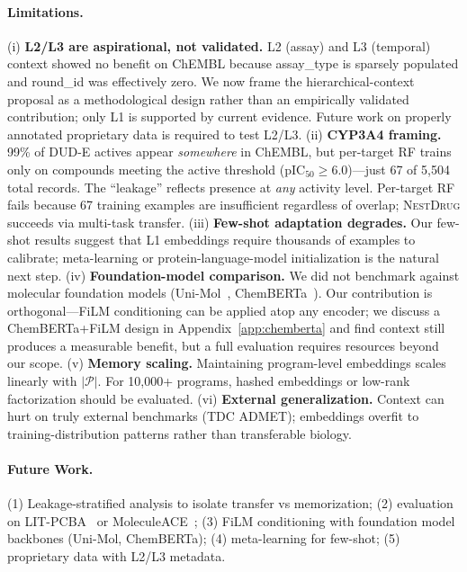 \documentclass[sigconf]{acmart}
\newcommand{\methodname}{\textsc{NestDrug}}
\begin{document}
\paragraph{Limitations.} (i) \textbf{L2/L3 are aspirational, not validated.} L2 (assay) and L3 (temporal) context showed no benefit on ChEMBL because assay\_type is sparsely populated and round\_id was effectively zero. We now frame the hierarchical-context proposal as a methodological design rather than an empirically validated contribution; only L1 is supported by current evidence. Future work on properly annotated proprietary data is required to test L2/L3. (ii) \textbf{CYP3A4 framing.} 99\% of DUD-E actives appear \textit{somewhere} in ChEMBL, but per-target RF trains only on compounds meeting the active threshold (pIC$_{50} \geq 6.0$)---just 67 of 5{,}504 total records. The ``leakage'' reflects presence at \textit{any} activity level. Per-target RF fails because 67 training examples are insufficient regardless of overlap; \methodname{} succeeds via multi-task transfer. (iii) \textbf{Few-shot adaptation degrades.} Our few-shot results suggest that L1 embeddings require thousands of examples to calibrate; meta-learning or protein-language-model initialization is the natural next step. (iv) \textbf{Foundation-model comparison.} We did not benchmark against molecular foundation models (Uni-Mol~\cite{zhou_2023_unimol}, ChemBERTa~\cite{chithrananda_2020_chemberta}). Our contribution is orthogonal---FiLM conditioning can be applied atop any encoder; we discuss a ChemBERTa+FiLM design in Appendix~\ref{app:chemberta} and find context still produces a measurable benefit, but a full evaluation requires resources beyond our scope. (v) \textbf{Memory scaling.} Maintaining program-level embeddings scales linearly with $|\mathcal{P}|$. For 10{,}000+ programs, hashed embeddings or low-rank factorization should be evaluated. (vi) \textbf{External generalization.} Context can hurt on truly external benchmarks (TDC ADMET); embeddings overfit to training-distribution patterns rather than transferable biology.

\paragraph{Future Work.} (1) Leakage-stratified analysis to isolate transfer vs memorization; (2) evaluation on LIT-PCBA~\cite{tran_2020_litpcba} or MoleculeACE~\cite{van_tilborg_2024_moleculeace}; (3) FiLM conditioning with foundation model backbones (Uni-Mol, ChemBERTa); (4) meta-learning for few-shot; (5) proprietary data with L2/L3 metadata.
\end{document}
